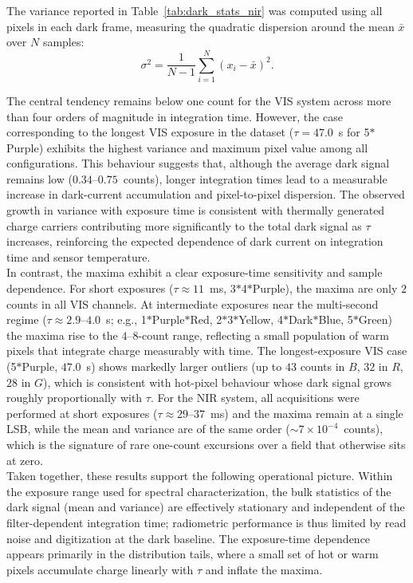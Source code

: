\noindent
The variance reported in Table~\ref{tab:dark_stats_nir} was computed using all pixels in each dark frame, measuring the quadratic dispersion around the mean \(\bar{x}\) over \(N\) samples:
\begin{equation}
    \sigma^{2} = \frac{1}{N - 1}\sum_{i=1}^{N}\left(x_{i} - \bar{x}\right)^{2}.
\end{equation}

\noindent
The central tendency remains below one count for the VIS system across more than four orders of magnitude in integration time. However, the case corresponding to the longest VIS exposure in the dataset (\(\tau\!=\!47.0\)~s for 5$\ast$Purple) exhibits the highest variance and maximum pixel value among all configurations. This behaviour suggests that, although the average dark signal remains low (\(0.34\)–\(0.75\)~counts), longer integration times lead to a measurable increase in dark-current accumulation and pixel-to-pixel dispersion. The observed growth in variance with exposure time is consistent with thermally generated charge carriers contributing more significantly to the total dark signal as \(\tau\) increases, reinforcing the expected dependence of dark current on integration time and sensor temperature.\\

\noindent
In contrast, the maxima exhibit a clear exposure-time sensitivity and sample dependence. For short exposures (\(\tau\approx 11\)~ms, 3$\ast$4$\ast$Purple), the maxima are only \(2\) counts in all VIS channels. At intermediate exposures near the multi-second regime (\(\tau\approx 2.9\)–\(4.0\)~s; e.g., 1$\ast$Purple$\ast$Red, 2$\ast$3$\ast$Yellow, 4$\ast$Dark$\ast$Blue, 5$\ast$Green) the maxima rise to the \(4\)–\(8\)-count range, reflecting a small population of warm pixels that integrate charge measurably with time. The longest-exposure VIS case (5$\ast$Purple, \(47.0\)~s) shows markedly larger outliers (up to \(43\) counts in \(B\), \(32\) in \(R\), \(28\) in \(G\)), which is consistent with hot-pixel behaviour whose dark signal grows roughly proportionally with \(\tau\). For the NIR system, all acquisitions were performed at short exposures (\(\tau\approx 29\)–\(37\)~ms) and the maxima remain at a single LSB, while the mean and variance are of the same order (\(\sim 7\times10^{-4}\)~counts), which is the signature of rare one-count excursions over a field that otherwise sits at zero.\\

\noindent
Taken together, these results support the following operational picture. Within the exposure range used for spectral characterization, the bulk statistics of the dark signal (mean and variance) are effectively stationary and independent of the filter-dependent integration time; radiometric performance is thus limited by read noise and digitization at the dark baseline. The exposure-time dependence appears primarily in the distribution tails, where a small set of hot or warm pixels accumulate charge linearly with \(\tau\) and inflate the maxima.


